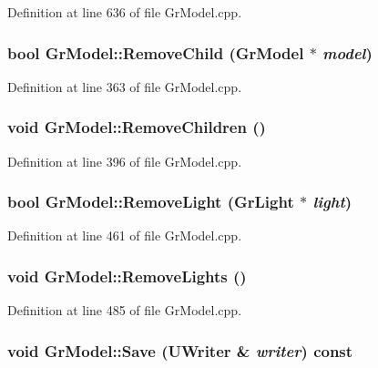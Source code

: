Definition at line 636 of file GrModel.cpp.\hypertarget{class_gr_model_9148b455251ccd009790f95c126ec936}{
\subsubsection[{RemoveChild}]{\setlength{\rightskip}{0pt plus 5cm}bool GrModel::RemoveChild ({\bf GrModel} $\ast$ {\em model})}}
\label{class_gr_model_9148b455251ccd009790f95c126ec936}




Definition at line 363 of file GrModel.cpp.\hypertarget{class_gr_model_79e3bfacd56b97bf810b971f064d4a91}{
\subsubsection[{RemoveChildren}]{\setlength{\rightskip}{0pt plus 5cm}void GrModel::RemoveChildren ()}}
\label{class_gr_model_79e3bfacd56b97bf810b971f064d4a91}




Definition at line 396 of file GrModel.cpp.\hypertarget{class_gr_model_931e8f832b0858244d75b1dda2d5a70d}{
\subsubsection[{RemoveLight}]{\setlength{\rightskip}{0pt plus 5cm}bool GrModel::RemoveLight ({\bf GrLight} $\ast$ {\em light})}}
\label{class_gr_model_931e8f832b0858244d75b1dda2d5a70d}




Definition at line 461 of file GrModel.cpp.\hypertarget{class_gr_model_95abd2705120c297a44287fe1d173224}{
\subsubsection[{RemoveLights}]{\setlength{\rightskip}{0pt plus 5cm}void GrModel::RemoveLights ()}}
\label{class_gr_model_95abd2705120c297a44287fe1d173224}




Definition at line 485 of file GrModel.cpp.\hypertarget{class_gr_model_94605ad2262faa9e3e858cd2f9b5d9d1}{
\subsubsection[{Save}]{\setlength{\rightskip}{0pt plus 5cm}void GrModel::Save ({\bf UWriter} \& {\em writer}) const}}
\label{class_gr_model_94605ad2262faa9e3e858cd2f9b5d9d1}




